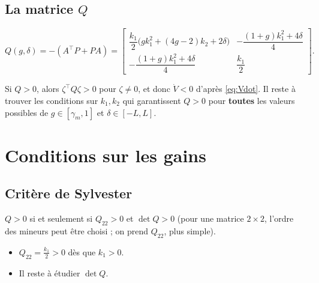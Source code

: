 \documentclass[11pt,a4paper]{article}
\numberwithin{equation}{section}
\theoremstyle{plain}
\theoremstyle{definition}
\theoremstyle{remark}
\begin{document}
\subsection{La matrice $Q$}
\begin{resultat}
\begin{equation}\label{eq:Q}
Q(g,\delta) = -(A^\top P+PA) = \begin{bmatrix}
\dfrac{k_1}{2}\Big(gk_1^2+(4g-2)k_2+2\delta\Big) & -\dfrac{(1+g)k_1^2+4\delta}{4}\\[10pt]
-\dfrac{(1+g)k_1^2+4\delta}{4} & \dfrac{k_1}{2}
\end{bmatrix}.
\end{equation}
\end{resultat}

\begin{idee}
Si $Q>0$, alors $\zeta^\top Q\zeta>0$ pour $\zeta\neq0$, et donc $\dot V<0$ d'après \eqref{eq:Vdot}.
Il reste à trouver les conditions sur $k_1,k_2$ qui garantissent $Q>0$ pour \textbf{toutes} les valeurs
possibles de $g\in[\gamma_m,1]$ et $\delta\in[-L,L]$.
\end{idee}

\section{Conditions sur les gains}

\subsection{Critère de Sylvester}
$Q>0$ si et seulement si $Q_{22}>0$ et $\det Q>0$ (pour une matrice $2\times2$, l'ordre des mineurs
peut être choisi ; on prend $Q_{22}$, plus simple).
\begin{itemize}
  \item $Q_{22} = \frac{k_1}{2}>0$ dès que $k_1>0$. \checkmark
  \item Il reste à étudier $\det Q$.
\end{itemize}
\end{document}
